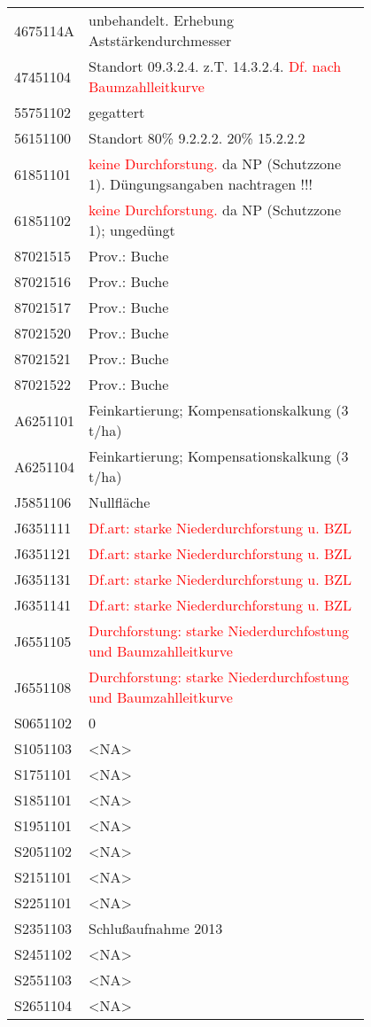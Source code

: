 \begin{singlespace}
{\begin{longtabu}{l p{0.8\linewidth}}
      4675114A & unbehandelt. Erhebung Aststärkendurchmesser \\
      47451104 & Standort 09.3.2.4. z.T. 14.3.2.4. \textcolor{red}{Df. nach Baumzahlleitkurve} \\
      55751102 & gegattert \\
      56151100 & Standort 80\% 9.2.2.2. 20\% 15.2.2.2 \\
      61851101 & \textcolor{red}{keine Durchforstung.} da NP (Schutzzone 1). Düngungsangaben nachtragen !!! \\
      61851102 & \textcolor{red}{keine Durchforstung.} da NP (Schutzzone 1); ungedüngt \\
      87021515 & Prov.: Buche \\
      87021516 & Prov.: Buche \\
      87021517 & Prov.: Buche \\
      87021520 & Prov.: Buche \\
      87021521 & Prov.: Buche \\
      87021522 & Prov.: Buche \\
      A6251101 & Feinkartierung; Kompensationskalkung (3 t/ha) \\
      A6251104 & Feinkartierung; Kompensationskalkung (3 t/ha) \\
      J5851106 & Nullfläche \\
      J6351111 & \textcolor{red}{Df.art: starke Niederdurchforstung u. BZL} \\
      J6351121 & \textcolor{red}{Df.art: starke Niederdurchforstung u. BZL} \\
      J6351131 & \textcolor{red}{Df.art: starke Niederdurchforstung u. BZL} \\
      J6351141 & \textcolor{red}{Df.art: starke Niederdurchforstung u. BZL} \\
      J6551105 & \textcolor{red}{Durchforstung: starke Niederdurchfostung und Baumzahlleitkurve} \\
      J6551108 & \textcolor{red}{Durchforstung: starke Niederdurchfostung und Baumzahlleitkurve} \\
      S0651102 & 0 \\
      S1051103 & <NA> \\
      S1751101 & <NA> \\
      S1851101 & <NA> \\
      S1951101 & <NA> \\
      S2051102 & <NA> \\
      S2151101 & <NA> \\
      S2251101 & <NA> \\
      S2351103 & Schlußaufnahme 2013 \\
      S2451102 & <NA> \\
      S2551103 & <NA> \\
      S2651104 & <NA> \\
    \end{longtabu}
  }
\end{singlespace}


